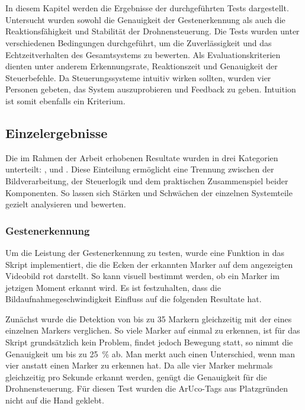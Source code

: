 \chapter{\chapFour}
\label{cha:chapter4} %

\begingroup
\fontsize{12pt}{14pt}\selectfont

In diesem Kapitel werden die Ergebnisse der durchgeführten Tests dargestellt.
Untersucht wurden sowohl die Genauigkeit der Gestenerkennung als auch die Reaktionsfähigkeit und Stabilität der Drohnensteuerung.
Die Tests wurden unter verschiedenen Bedingungen durchgeführt, um die Zuverlässigkeit und das Echtzeitverhalten des Gesamtsystems zu bewerten.
Als Evaluationskriterien dienten unter anderem Erkennungsrate, Reaktionszeit und Genauigkeit der Steuerbefehle.
Da Steuerungssysteme intuitiv wirken sollten, wurden vier Personen gebeten, das System auszuprobieren und Feedback zu geben.
Intuition ist somit ebenfalls ein Kriterium.

\section{Einzelergebnisse}

Die im Rahmen der Arbeit erhobenen Resultate wurden in drei Kategorien unterteilt: ,  und .
Diese Einteilung ermöglicht eine Trennung zwischen der Bildverarbeitung, der Steuerlogik und dem praktischen Zusammenspiel beider Komponenten.
So lassen sich Stärken und Schwächen der einzelnen Systemteile gezielt analysieren und bewerten.

\subsection{Gestenerkennung}
\label{sub:geRec}

Um die Leistung der Gestenerkennung zu testen, wurde eine Funktion in das Skript implementiert, die die Ecken der erkannten Marker auf dem angezeigten Videobild rot darstellt.
So kann visuell bestimmt werden, ob ein Marker im jetzigen Moment erkannt wird.
Es ist festzuhalten, dass die Bildaufnahmegeschwindigkeit Einfluss auf die folgenden Resultate hat.\footnotemark{}

Zunächst wurde die Detektion von bis zu 35 Markern gleichzeitig mit der eines einzelnen Markers verglichen.
So viele Marker auf einmal zu erkennen, ist für das Skript grundsätzlich kein Problem, findet jedoch Bewegung statt, so nimmt die Genauigkeit um bis zu \SI{25}{\percent} ab.
Man merkt auch einen Unterschied, wenn man vier anstatt einen Marker zu erkennen hat.
Da alle vier Marker mehrmals gleichzeitig pro Sekunde erkannt werden, genügt die Genauigkeit für die Drohnensteuerung.
Für diesen Test wurden die ArUco-Tags aus Platzgründen nicht auf die Hand geklebt.

